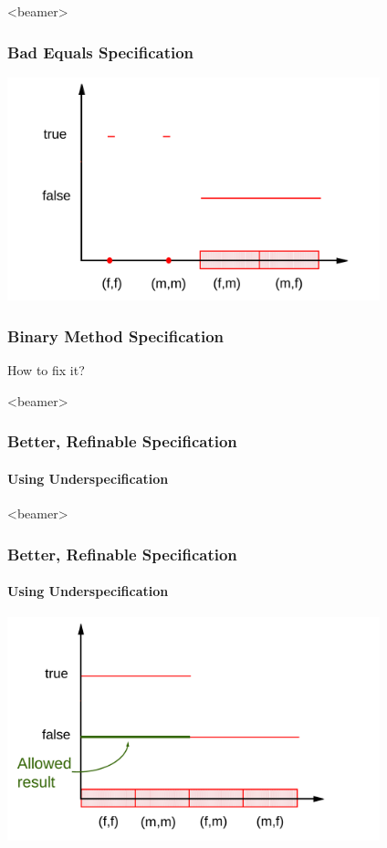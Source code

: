 \begin{frame}<beamer>
\frametitle{Bad Equals Specification}
\transdissolve[duration=0.5]
\includegraphics[width=4.25in]{equalsbad2}
\end{frame}

\begin{frame}
\frametitle{Binary Method Specification}
\begin{question}
How to fix it?

\rm

\end{question}
\end{frame}

\begin{frame}<beamer>
\frametitle{Better, Refinable Specification}
\framesubtitle{Using Underspecification}

\end{frame}

\begin{frame}<beamer>
\frametitle{Better, Refinable Specification}
\framesubtitle{Using Underspecification}
\includegraphics[width=4.25in]{equalsgood}
\end{frame}


